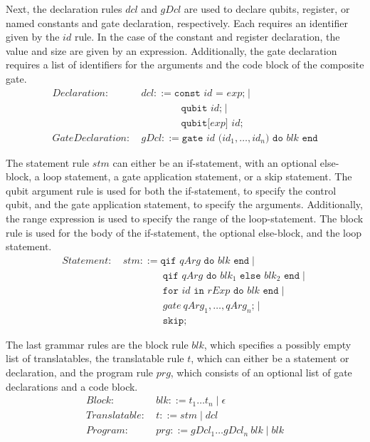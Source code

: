 Next, the declaration rules $dcl$ and $gDcl$ are used to declare qubits, register, or named constants and gate declaration, respectively. Each requires an identifier given by the $id$ rule. In the case of the constant and register declaration, the value and size are given by an expression. Additionally, the gate declaration requires a list of identifiers for the arguments and the code block of the composite gate.
\begin{align*}
    Declaration: \ & dcl ::= \texttt{const } id \texttt{ = } exp \texttt{;} \mid \\
                 & \quad \quad \quad \quad \texttt{qubit } id \texttt{;} \mid \\
                 & \quad \quad \quad \quad \texttt{qubit[} exp \texttt{] } id \texttt{;}\\
    GateDeclaration: \ & gDcl::= \texttt{gate } id \texttt{ (}id_1, \dots, id_n\texttt{) do } blk \texttt{ end}
\end{align*}

The statement rule $stm$ can either be an if-statement, with an optional else-block, a loop statement, a gate application statement, or a skip statement. The qubit argument rule is used for both the if-statement, to specify the control qubit, and the gate application statement, to specify the arguments. Additionally, the range expression is used to specify the range of the loop-statement. The block rule is used for the body of the if-statement, the optional else-block, and the loop statement.
\begin{align*}
    Statement: \ & stm ::= \texttt{qif } qArg \texttt{ do }  blk \texttt{ end} \mid\\
                 & \quad \quad \quad \quad \texttt{qif } qArg \texttt{ do }  blk_1 \texttt{ else } blk_2 \texttt{ end} \mid\\
                 & \quad \quad \quad \quad \texttt{for } id \texttt{ in } rExp \texttt{ do } blk \texttt{ end} \mid \\
                 & \quad \quad \quad \quad gate \ qArg_1, \dots, qArg_n \texttt{;} \mid \\
                 & \quad \quad \quad \quad \texttt{skip;}
\end{align*}

The last grammar rules are the block rule $blk$, which specifies a possibly empty list of translatables, the translatable rule $t$, which can either be a statement or declaration, and the program rule $prg$, which consists of an optional list of gate declarations and a code block. 
\begin{align*}
    Block: \ & blk::= t_1 \dots t_n \mid \epsilon\\
    Translatable : \ & t::= stm \mid dcl\\
    Program: \ & prg ::= gDcl_1 \dots gDcl_n \ blk \mid blk 
\end{align*}

